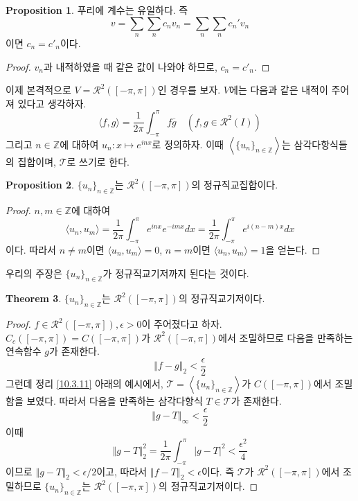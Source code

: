 \documentclass[11pt]{book}
\numberwithin{equation}{chapter}
\def\ZZ{\mathbb{Z}}
\def\eps{\epsilon}
\def\calT{\mathcal{T}}
\def\calR{\mathcal{R}}
\newcommand{\inner}[2]{\langle#1, #2\rangle}
\newcommand{\abs}[1]{\left\vert#1\right\vert}
\newcommand{\norm}[1]{\left\Vert#1\right\Vert}
\newcommand{\gen}[1]{\left\langle#1\right\rangle}
\theoremstyle{definition}
\newtheorem{thm}{Theorem}[section]
\newtheorem{prop}[thm]{Proposition}
\begin{document}
\begin{prop}
    푸리에 계수는 유일하다. 즉
    \[
        v = \sum_{n} \sum_n c_n v_n = \sum_n \sum_n c_n' v_n
    \]
    이면 \(c_n = c'_n\)이다.
\end{prop}
\begin{proof}
    \(v_n\)과 내적하였을 때 같은 값이 나와야 하므로, \(c_n = c'_n\).
\end{proof}

이제 본격적으로 \(V = \calR^2([-\pi, \pi])\)인 경우를 보자. \(V\)에는 다음과 같은 내적이 주어져 있다고 생각하자.
\[
    \inner{f}{g} = \frac{1}{2\pi} \int_{-\pi}^\pi f\overline{g} \quad (f, g \in \calR^2(I))
\]
그리고 \(n \in \ZZ\)에 대하여 \(u_n : x \mapsto e^{inx}\)로 정의하자. 이때 \(\gen{\{u_n\}_{n \in \ZZ}}\)는 삼각다항식들의 집합이며, \(\calT\)로 쓰기로 한다.

\begin{prop}
    \(\{u_n\}_{n \in \ZZ}\)는 \(\calR^2([-\pi, \pi])\)의 정규직교집합이다.
\end{prop}
\begin{proof}
    \(n, m \in \ZZ\)에 대하여
    \[
        \inner{u_n}{u_m} = \frac{1}{2\pi}\int_{-\pi}^\pi e^{inx} e^{-imx} dx = \frac{1}{2\pi}\int_{-\pi}^\pi e^{i(n-m)x} dx
    \]
    이다. 따라서 \(n \ne m\)이면 \(\inner{u_n}{u_m}  = 0\), \(n = m\)이면 \(\inner{u_n}{u_m} = 1\)을 얻는다.
\end{proof}

우리의 주장은 \(\{u_n\}_{n \in \ZZ}\)가 정규직교기저까지 된다는 것이다.

\begin{thm}
    \(\{u_n\}_{n \in \ZZ}\)는 \(\calR^2([-\pi, \pi])\)의 정규직교기저이다.
\end{thm}

\begin{proof}
    \(f \in \calR^2([-\pi, \pi]), \eps > 0\)이 주어졌다고 하자. \(C_c([-\pi, \pi]) = C([-\pi, \pi])\)가 \( \calR^2([-\pi, \pi])\)에서 조밀하므로 다음을 만족하는 연속함수 \(g\)가 존재한다.
    \[
        \norm{f - g}_2 < \frac{\eps}{2}
    \]
    그런데 정리 \ref{10.3.11} 아래의 예시에서, \(\calT = \gen{\{u_n\}_{n \in \ZZ}}\)가 \(C([-\pi, \pi])\)에서 조밀함을 보였다. 따라서 다음을 만족하는 삼각다항식 \(T \in \calT\)가 존재한다.
    \[
        \norm{g - T}_{\infty} < \frac{\eps}{2}
    \]
    이때
    \[
        \norm{g - T}_2^2 = \frac{1}{2\pi} \int_{-\pi}^\pi \abs{g - T}^2 < \frac{\eps^2}{4}
    \]
    이므로 \(\norm{g - T}_2 < \eps/2\)이고, 따라서 \(\norm{f - T}_2 < \eps\)이다. 즉 \(\calT\)가 \(\calR^2([-\pi, \pi])\)에서 조밀하므로 \(\{u_n\}_{n \in \ZZ}\)는 \(\calR^2([-\pi, \pi])\)의 정규직교기저이다.
\end{proof}
\end{document}
